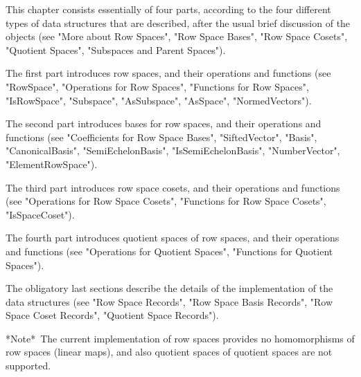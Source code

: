
This chapter consists essentially of four parts, according to the four
different types of data structures that are described, after the usual brief
discussion of the objects (see "More about Row Spaces",  "Row Space Bases",
"Row Space Cosets", "Quotient Spaces", "Subspaces and Parent Spaces").

The first part introduces row spaces, and their operations and functions
(see "RowSpace", "Operations for Row Spaces", "Functions for Row Spaces",
"IsRowSpace", "Subspace", "AsSubspace", "AsSpace", "NormedVectors").

The second part introduces bases for row spaces, and their operations and
functions (see "Coefficients for Row Space Bases", "SiftedVector", "Basis",
"CanonicalBasis", "SemiEchelonBasis", "IsSemiEchelonBasis", "NumberVector",
"ElementRowSpace").

The third part introduces row space cosets, and their operations and
functions (see "Operations for Row Space Cosets", "Functions for Row Space
Cosets", "IsSpaceCoset").

The fourth part introduces quotient spaces of row spaces, and their
operations and functions (see "Operations for Quotient Spaces", "Functions
for Quotient Spaces").

The obligatory last sections describe the details of the implementation of
the data structures (see "Row Space Records", "Row Space Basis Records",
"Row Space Coset Records", "Quotient Space Records").

*Note*\:\ 
The current implementation of row spaces provides no homomorphisms of
row spaces (linear maps), and also quotient spaces of quotient spaces are
not supported.

